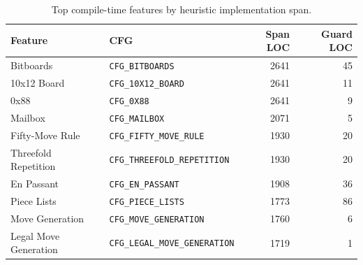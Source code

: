 \begin{table}[t]
\centering
\caption{Top compile-time features by heuristic implementation span.}
\label{tab:feature-span-top}
\begin{tabular}{llrr}
\toprule
Feature & CFG & Span LOC & Guard LOC \\
\midrule
Bitboards & \texttt{CFG\_BITBOARDS} & 2641 & 45 \\
10x12 Board & \texttt{CFG\_10X12\_BOARD} & 2641 & 11 \\
0x88 & \texttt{CFG\_0X88} & 2641 & 9 \\
Mailbox & \texttt{CFG\_MAILBOX} & 2071 & 5 \\
Fifty-Move Rule & \texttt{CFG\_FIFTY\_MOVE\_RULE} & 1930 & 20 \\
Threefold Repetition & \texttt{CFG\_THREEFOLD\_REPETITION} & 1930 & 20 \\
En Passant & \texttt{CFG\_EN\_PASSANT} & 1908 & 36 \\
Piece Lists & \texttt{CFG\_PIECE\_LISTS} & 1773 & 86 \\
Move Generation & \texttt{CFG\_MOVE\_GENERATION} & 1760 & 6 \\
Legal Move Generation & \texttt{CFG\_LEGAL\_MOVE\_GENERATION} & 1719 & 1 \\
\bottomrule
\end{tabular}
\end{table}
